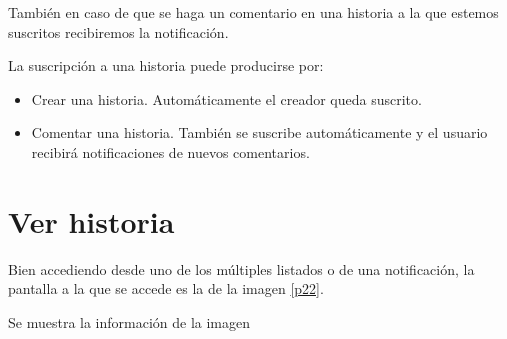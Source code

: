 \documentclass[11pt,a4paper, titlepage]{article}
\begin{document}
	También en caso de que se haga un comentario en una historia a la que estemos suscritos recibiremos la notificación.
	
	La suscripción a una historia puede producirse por:
	\begin{itemize}
		\item Crear una historia. Automáticamente el creador queda suscrito.
		\item Comentar una historia. También se suscribe automáticamente y el usuario recibirá notificaciones de nuevos comentarios.
	\end{itemize}
	
	\FloatBarrier
	\section{Ver historia}
	
	Bien accediendo desde uno de los múltiples listados o de una notificación, la pantalla a la que se accede es la de la imagen \ref{p22}.
	
	Se muestra la información de la imagen
	
\end{document}
